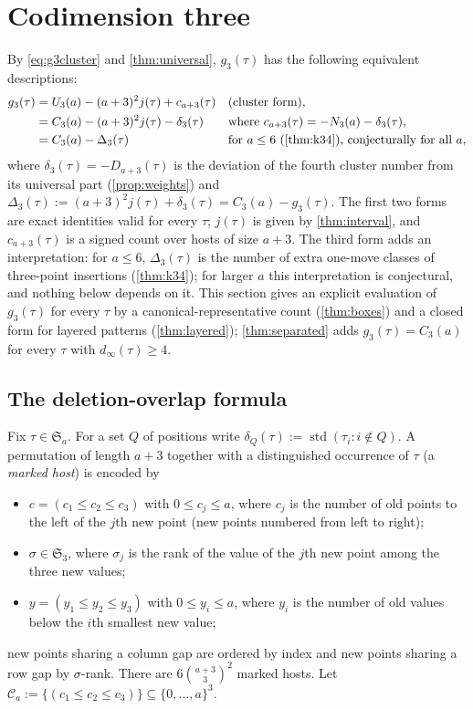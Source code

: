 \documentclass[11pt,reqno]{amsart}
\theoremstyle{plain}
\theoremstyle{definition}
\theoremstyle{remark}
\newcommand{\std}{\operatorname{std}}
\newcommand{\Sym}{\mathfrak{S}}
\begin{document}
\section{Codimension three}\label{sec:codim3}

By \eqref{eq:g3cluster} and \cref{thm:universal}, $g_3(\tau)$ has the following equivalent descriptions:
\begin{align}
g_3(\tau)&=U_3(a)-(a+3)^2j(\tau)+c_{a+3}(\tau) && \text{(cluster form)},\label{eq:g3a}\\
&=C_3(a)-(a+3)^2j(\tau)-\delta_3(\tau) && \text{where }c_{a+3}(\tau)=-N_3(a)-\delta_3(\tau),\label{eq:g3b}\\
&=C_3(a)-\Delta_3(\tau) && \text{for }a\le6\text{ (\cref{thm:k34}), conjecturally for all }a,\label{eq:g3c}
\end{align}
where $\delta_3(\tau)=-D_{a+3}(\tau)$ is the deviation of the fourth cluster number from its universal part (\cref{prop:weights}) and $\Delta_3(\tau):=(a+3)^2j(\tau)+\delta_3(\tau)=C_3(a)-g_3(\tau)$. The first two forms are exact identities valid for every $\tau$; $j(\tau)$ is given by \cref{thm:interval}, and $c_{a+3}(\tau)$ is a signed count over hosts of size $a+3$. The third form adds an interpretation: for $a\le6$, $\Delta_3(\tau)$ is the number of extra one-move classes of three-point insertions (\cref{thm:k34}); for larger $a$ this interpretation is conjectural, and nothing below depends on it. This section gives an explicit evaluation of $g_3(\tau)$ for every $\tau$ by a canonical-representative count (\cref{thm:boxes}) and a closed form for layered patterns (\cref{thm:layered}); \cref{thm:separated} adds $g_3(\tau)=C_3(a)$ for every $\tau$ with $d_\infty(\tau)\ge4$.

\subsection{The deletion-overlap formula}\label{sec:boxes}

Fix $\tau\in\Sym_a$. For a set $Q$ of positions write $\delta_Q(\tau):=\std(\tau_i:i\notin Q)$. A permutation of length $a+3$ together with a distinguished occurrence of $\tau$ (a \emph{marked host}) is encoded by
\begin{itemize}
\item $c=(c_1\le c_2\le c_3)$ with $0\le c_j\le a$, where $c_j$ is the number of old points to the left of the $j$th new point (new points numbered from left to right);
\item $\sigma\in\Sym_3$, where $\sigma_j$ is the rank of the value of the $j$th new point among the three new values;
\item $y=(y_1\le y_2\le y_3)$ with $0\le y_i\le a$, where $y_i$ is the number of old values below the $i$th smallest new value;
\end{itemize}
new points sharing a column gap are ordered by index and new points sharing a row gap by $\sigma$-rank. There are $6\binom{a+3}{3}^2$ marked hosts. Let $\mathcal C_a:=\{(c_1\le c_2\le c_3)\}\subseteq\{0,\dots,a\}^3$.
\end{document}

